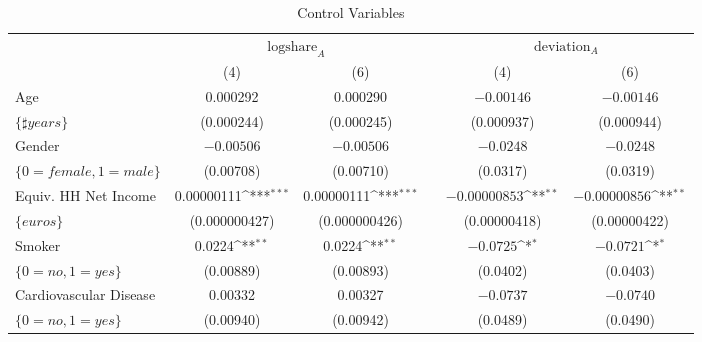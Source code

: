 \documentclass[smallcondensed]{svjour3}
\begin{document}
\begin{landscape}
\begin{table}[ht!]
{{\begin{tabularx}{16cm}{l*{6}{c}}
\end{tabularx}
}}
\end{table}
\end{landscape}
%
\clearpage
%
\begin{table}[ht]
\centering
\caption{Control Variables}\label{tab:regression_share_cov}
{\footnotesize
{
\def\sym#1{\ifmmode^{#1}\else\(^{#1}\)\fi}
\begin{tabularx}{13.5cm}{lccccc}\hline
                            & \multicolumn{2}{c}{$\mbox{logshare}_A$}              &   & \multicolumn{2}{c}{$\mbox{deviation}_A$}              \\\cline{2-3}\cline{5-6}
                            & \multicolumn{1}{c}{(4)}   &\multicolumn{1}{c}{(6)}   &   & \multicolumn{1}{c}{(4)}   & \multicolumn{1}{c}{(6)}   \\\hline\hline
   Age                      &   0.000292               &   0.000290                &   & $-0.00146$                & $-0.00146$                \\
   $\{\sharp years\}$       &  (0.000244)              &  (0.000245)               &   &  (0.000937)               &  (0.000944)               \\
   [1em]
   Gender                   & $-0.00506$               & $-0.00506$                &   & $-0.0248$                 & $-0.0248$                 \\
   $\{0=female,1=male\}$    &  (0.00708)               &  (0.00710)                &   &  (0.0317)                 &  (0.0319)                 \\
   [1em]
   Equiv. HH Net Income     &   0.00000111\sym{***}    &   0.00000111\sym{***}     &   & $-0.00000853$\sym{**}     & $-0.00000856$\sym{**}     \\
   $\{euros\}$              &  (0.000000427)           &  (0.000000426)            &   &  (0.00000418)             &  (0.00000422)             \\
   [1em]
   Smoker                   &   0.0224\sym{**}         &   0.0224\sym{**}          &   & $-0.0725$\sym{*}          & $-0.0721$\sym{*}          \\
   $\{0=no,1=yes\}$         &  (0.00889)               &  (0.00893)                &   &  (0.0402)                 &  (0.0403)                 \\
   [1em]
   Cardiovascular Disease   &   0.00332                &   0.00327                 &   & $-0.0737$                 & $-0.0740$                 \\
   $\{0=no,1=yes\}$         &  (0.00940)               &  (0.00942)                &   &  (0.0489)                 &  (0.0490)                 \\

\end{tabularx}}}
\end{table}
\end{document}

